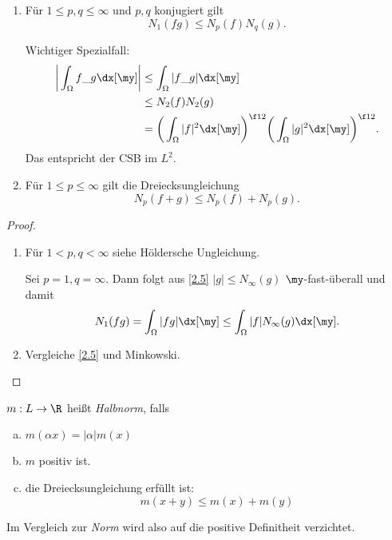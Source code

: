 \begin{kor} \label{2.8}
	\begin{enumerate}[1)]
		\item
			Für $1 \le p,q \le \infty$ und $p,q$ konjugiert gilt
			\[
				N_1(fg) \le N_p(f) N_q(g).
			\]
			\begin{note}
				Wichtiger Spezialfall:
				\begin{align*}
					\bigg| \int_{\Omega} f \_g \dx[\my] \bigg|
					&\le \int_{\Omega} |f \_g| \dx[\my] \\
					&\le N_2(f) N_2(g) \\
					&= \bigg( \int_{\Omega} |f|^2 \dx[\my] \bigg)^{\f 12} \bigg( \int_{\Omega} |g|^2 \dx[\my] \bigg)^{\f 12}.
				\end{align*}
				Das entspricht der CSB im $L^2$.
			\end{note}
		\item
			Für $1 \le p \le \infty$ gilt die Dreiecksungleichung
			\[
				N_p(f+g) \le N_p(f) + N_p(g).
			\]
	\end{enumerate}
	\begin{proof}
		\begin{enumerate}[1)]
			\item
				Für $1 < p,q < \infty$ siehe Höldersche Ungleichung.

				Sei $p=1, q = \infty$.
				Dann folgt aus \ref{2.5} $|g| \le N_\infty(g)$ $\my$-fast-überall und damit
				\[
					N_1(fg) = \int_{\Omega} |fg| \dx[\my] \le \int_{\Omega}|f| N_\infty (g) \dx[\my].
				\]
			\item
				Vergleiche \ref{2.5} und Minkowski.
		\end{enumerate}
	\end{proof}
\end{kor}

\begin{df*} 
	$m : L \to \R$ heißt \emph{Halbnorm}, falls
	\begin{enumerate}[a)]
		\item
			$\displaystyle m(\alpha x) = |\alpha| m(x)$
		\item
			$m$ positiv ist.
		\item
			die Dreiecksungleichung erfüllt ist:
			\[
				m(x+y) \le m(x) + m(y)
			\]
	\end{enumerate}
	\begin{note}
		Im Vergleich zur \emph{Norm} wird also auf die positive Definitheit verzichtet.
	\end{note}
\end{df*}


